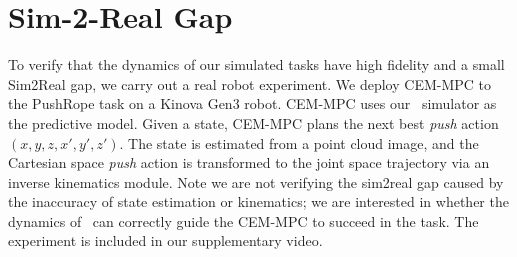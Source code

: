 \section{Sim-2-Real Gap}

To verify that the dynamics of our simulated tasks have high fidelity and a small Sim2Real gap, we carry out a real robot experiment.
We deploy CEM-MPC to the PushRope task on a Kinova Gen3 robot.
CEM-MPC uses our \simulator\ simulator as the predictive model. Given a state, CEM-MPC plans the next best \textit{push} action $(x, y, z, x', y', z')$.
The state is estimated from a point cloud image, and the Cartesian space \textit{push} action is transformed to the joint space trajectory via an inverse kinematics module. Note we are not verifying the sim2real gap caused by the inaccuracy of state estimation or kinematics; we are interested in whether the dynamics of \simulator\ can correctly guide the CEM-MPC to succeed in the task. The experiment is included in our supplementary video.
